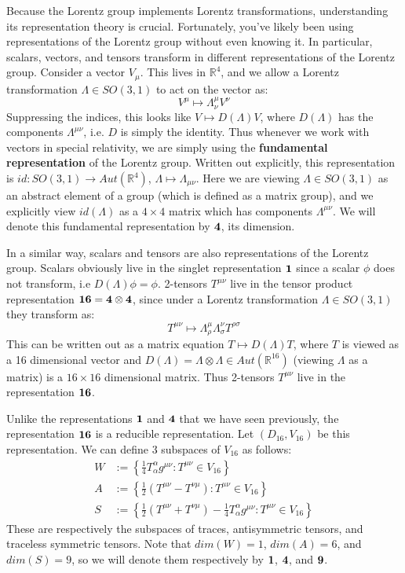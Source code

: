 \documentclass[11pt, oneside]{article}   	%
\theoremstyle{definition}
\begin{document}
Because the Lorentz group implements Lorentz transformations, understanding its representation theory is crucial. 
Fortunately, you've likely been using representations of the Lorentz group without even knowing it. In particular, scalars, 
vectors, and tensors transform in different representations of the Lorentz group. Consider a vector $V_\mu$. This lives 
in $\mathbb R^4$, and we allow a Lorentz transformation $\Lambda\in SO(3, 1)$ to act on the vector as:
\begin{equation}
	V^\mu\mapsto \Lambda^\mu_\nu V^\nu
\end{equation}
Suppressing the indices, this looks like $V\mapsto D(\Lambda) V$, where $D(\Lambda)$ has the components 
$\Lambda^{\mu\nu}$, i.e. $D$ is simply the identity. Thus whenever we work with vectors in special relativity, we are 
simply using the \textbf{fundamental representation} of the Lorentz group. Written out explicitly, this representation is 
$id : SO(3, 1)\rightarrow Aut(\mathbb R^4)$, $\Lambda\mapsto \Lambda_{\mu\nu}$. Here we are viewing $\Lambda
\in SO(3, 1)$ as an abstract element of a group (which is defined as a matrix group), and we explicitly view $id(\Lambda)$ 
as a $4\times 4$ matrix which has components $\Lambda^{\mu\nu}$. We will denote this fundamental representation 
by $\bf{4}$, its dimension.

In a similar way, scalars and tensors are also representations of the Lorentz group. Scalars obviously live in the singlet 
representation $\bf{1}$ since a scalar $\phi$ does not transform, i.e $D(\Lambda)\phi = \phi$. 2-tensors $T^{\mu\nu}$ live in 
the tensor product representation $\bf 16 = 4\otimes 4$, since under a Lorentz transformation $\Lambda\in SO(3, 1)$ they 
transform as:
\begin{equation}
	T^{\mu\nu}\mapsto \Lambda^\mu_\rho \Lambda^\nu_\sigma T^{\rho\sigma}
\end{equation}
This can be written out as a matrix equation $T\mapsto D(\Lambda) T$, where $T$ is viewed as a 16 dimensional vector 
and $D(\Lambda) = \Lambda\otimes\Lambda\in Aut(\mathbb R^{16})$ (viewing $\Lambda$ as a matrix) is a $16\times 16$ 
dimensional matrix. Thus 2-tensors $T^{\mu\nu}$ live in the representation $\bf 16$. 

Unlike the representations $\bf 1$ and $\bf 4$ that we have seen previously, the representation $\bf 16$ is a reducible 
representation. Let $(D_{16}, V_{16})$ be this representation. We can define 3 subspaces of $V_{16}$ as follows:
\begin{align}
	W &:= \left\{\frac{1}{4}T^\alpha_\alpha g^{\mu\nu} : T^{\mu\nu}\in V_{16}\right\}\nonumber \\
	A &:= \left\{\frac{1}{2}(T^{\mu\nu} - T^{\nu\mu}) : T^{\mu\nu} \in V_{16}\right\} \label{eq:sixteen_irreps} \\
	S &:= \left\{\frac{1}{2}(T^{\mu\nu} + T^{\nu\mu}) - \frac{1}{4} T^\alpha_\alpha g^{\mu\nu}: T^{\mu\nu} \in V_{16}\right\} 
	\nonumber
\end{align}
These are respectively the subspaces of traces, antisymmetric tensors, and traceless symmetric tensors. Note that $dim(W) = 
1$, $dim(A) = 6$, and $dim(S) = 9$, so we will denote them respectively by $\bf 1$, $\bf 4$, and $\bf 9$. 
\end{document}
